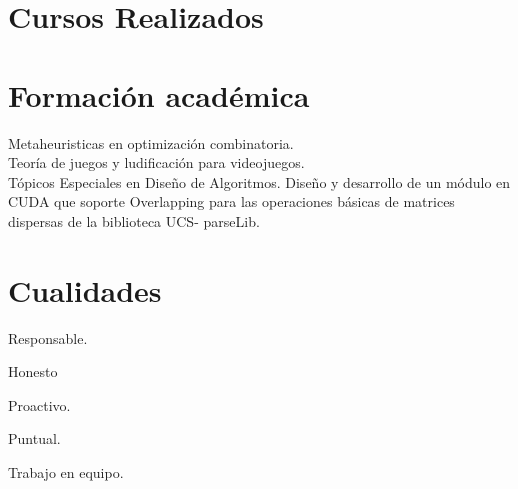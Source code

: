 \documentclass[letterpaper]{twentysecondcv} %
\begin{document}
\begin{twenty} %
\end{twenty}


\section{Cursos Realizados}

\begin{twenty}
\end{twenty}

\section{Formación académica}

\begin{twentyshort} %
	{
		Metaheuristicas en optimización combinatoria. \\ 
		Teoría de juegos y ludificación para videojuegos. \\
		Tópicos Especiales en Diseño de Algoritmos.
	}
	{\normalfont
		Diseño y desarrollo de un módulo en CUDA que soporte Overlapping para las
		operaciones básicas de matrices dispersas de la biblioteca UCS- parseLib.
	}
\end{twentyshort}

\section{Cualidades}

\begin{compactitem}[\color{blue}$\circ$]
	\item Responsable. 
	\item Honesto
	\item Proactivo.
	\item Puntual.
	\item Trabajo en equipo.
\end{compactitem}
\end{document}
